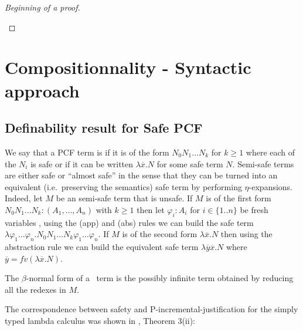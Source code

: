 \begin{proof}[Beginning of a proof]
\begin{enumerate}[I.]
\begin{enumerate}
\begin{enumerate}
	\end{enumerate}
\end{enumerate}

\end{enumerate} 
\end{proof}

\section{Compositionnality - Syntactic approach}

\subsection{Definability result for Safe PCF}

We say that a PCF term is  if it is of the form $N_0 N_1 \ldots N_k$ for $k\geq 1$ where each of the $N_i$ is safe or if it can be written $\lambda \overline{x} . N$ for some safe term $N$. Semi-safe terms are either safe or ``almost safe'' in the sense that they can be turned into an equivalent (i.e.~preserving the semantics) safe term  by performing $\eta$-expansions. Indeed, let $M$ be an semi-safe term that is unsafe.
If $M$ is of the first form $N_0 N_1 \ldots N_k : (A_1,\ldots,A_n)$ with $k\geq 1$ then let $\varphi_i:A_i$ for $i\in\{1..n\}$ be fresh variables , using the (app) and (abs) rules we can build the safe term $\lambda \varphi_1 \ldots \varphi_n . N_0 N_1 \ldots N_k \varphi_1 \ldots \varphi_n$. If $M$ is of the second form $\lambda \overline{x} . N$ then using the abstraction rule we can build the equivalent safe term $\lambda \overline{y} \overline{x}. N$  where $\overline{y} = fv(\lambda \overline{x}. N)$.

The $\beta$-normal form of a \pcf\ term is the possibly infinite term obtained by reducing all the redexes in $M$.



The correspondence between safety and P-incremental-justification for the simply typed lambda calculus was shown
in \cite{blumong:safelambdacalculus}, Theorem 3(ii):

